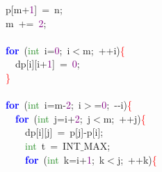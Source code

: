 {{\mbox{}\ \ \ \ p\textcolor{BrickRed}{[}m\textcolor{BrickRed}{+}\textcolor{Purple}{1}\textcolor{BrickRed}{]}\ \textcolor{BrickRed}{=}\ n\textcolor{BrickRed}{;} \\
\mbox{}\ \ \ \ m\ \textcolor{BrickRed}{+=}\ \textcolor{Purple}{2}\textcolor{BrickRed}{;} \\
\mbox{} \\
\mbox{}\ \ \ \ \textbf{\textcolor{Blue}{for}}\ \textcolor{BrickRed}{(}\textcolor{ForestGreen}{int}\ i\textcolor{BrickRed}{=}\textcolor{Purple}{0}\textcolor{BrickRed}{;}\ i\textcolor{BrickRed}{$<$}m\textcolor{BrickRed}{;}\ \textcolor{BrickRed}{++}i\textcolor{BrickRed}{)}\textcolor{Red}{\{} \\
\mbox{}\ \ \ \ \ \ dp\textcolor{BrickRed}{[}i\textcolor{BrickRed}{][}i\textcolor{BrickRed}{+}\textcolor{Purple}{1}\textcolor{BrickRed}{]}\ \textcolor{BrickRed}{=}\ \textcolor{Purple}{0}\textcolor{BrickRed}{;} \\
\mbox{}\ \ \ \ \textcolor{Red}{\}} \\
\mbox{}\ \ \ \  \\
\mbox{}\ \ \ \ \textbf{\textcolor{Blue}{for}}\ \textcolor{BrickRed}{(}\textcolor{ForestGreen}{int}\ i\textcolor{BrickRed}{=}m\textcolor{BrickRed}{-}\textcolor{Purple}{2}\textcolor{BrickRed}{;}\ i\textcolor{BrickRed}{$>$=}\textcolor{Purple}{0}\textcolor{BrickRed}{;}\ \textcolor{BrickRed}{-\/-}i\textcolor{BrickRed}{)}\textcolor{Red}{\{} \\
\mbox{}\ \ \ \ \ \ \textbf{\textcolor{Blue}{for}}\ \textcolor{BrickRed}{(}\textcolor{ForestGreen}{int}\ j\textcolor{BrickRed}{=}i\textcolor{BrickRed}{+}\textcolor{Purple}{2}\textcolor{BrickRed}{;}\ j\textcolor{BrickRed}{$<$}m\textcolor{BrickRed}{;}\ \textcolor{BrickRed}{++}j\textcolor{BrickRed}{)}\textcolor{Red}{\{} \\
\mbox{}\ \ \ \ \ \ \ \ dp\textcolor{BrickRed}{[}i\textcolor{BrickRed}{][}j\textcolor{BrickRed}{]}\ \textcolor{BrickRed}{=}\ p\textcolor{BrickRed}{[}j\textcolor{BrickRed}{]-}p\textcolor{BrickRed}{[}i\textcolor{BrickRed}{];} \\
\mbox{}\ \ \ \ \ \ \ \ \textcolor{ForestGreen}{int}\ t\ \textcolor{BrickRed}{=}\ INT$\_$MAX\textcolor{BrickRed}{;} \\
\mbox{}\ \ \ \ \ \ \ \ \textbf{\textcolor{Blue}{for}}\ \textcolor{BrickRed}{(}\textcolor{ForestGreen}{int}\ k\textcolor{BrickRed}{=}i\textcolor{BrickRed}{+}\textcolor{Purple}{1}\textcolor{BrickRed}{;}\ k\textcolor{BrickRed}{$<$}j\textcolor{BrickRed}{;}\ \textcolor{BrickRed}{++}k\textcolor{BrickRed}{)}\textcolor{Red}{\{} \\
}}
